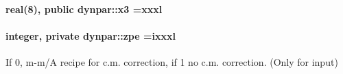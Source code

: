 \paragraph[{\texorpdfstring{x3}{x3}}]{\setlength{\rightskip}{0pt plus 5cm}real(8), public dynpar\+::x3 =xxxl}\hypertarget{namespacedynpar_a342536ef5b89d8d63d638f7e1545c34d}{}\label{namespacedynpar_a342536ef5b89d8d63d638f7e1545c34d}
\paragraph[{\texorpdfstring{zpe}{zpe}}]{\setlength{\rightskip}{0pt plus 5cm}integer, private dynpar\+::zpe =ixxxl\hspace{0.3cm}{\ttfamily [private]}}\hypertarget{namespacedynpar_a51648067194ef0a15f4788803ad9dc15}{}\label{namespacedynpar_a51648067194ef0a15f4788803ad9dc15}


If 0, m-\/m/A recipe for c.\+m. correction, if 1 no c.\+m. correction. (Only for input) 

